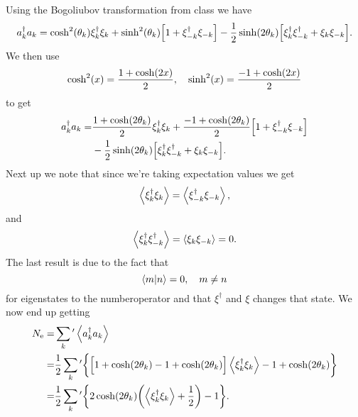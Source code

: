 \documentclass[11pt,letter, swedish, english
]{article}
\begin{document}
Using the Bogoliubov transformation from class we have
\begin{equation}
\begin{aligned}
a^\dagger_ka_k=\cosh^2(\theta_k) \xi^\dagger_k\xi_k 
+\sinh^2(\theta_k)\qty[1+\xi^\dagger_{-k}\xi_{-k} ]
-\frac{1}{2}\sinh(2\theta_k) 
\qty[\xi^\dagger_{k}\xi^\dagger_{-k}+\xi_{k}\xi_{-k}].
\end{aligned}
\end{equation}
We then use
\begin{equation}
\cosh^2(x)=\frac{1+\cosh(2x)}{2}\qcomma
\sinh^2(x)=\frac{-1+\cosh(2x)}{2}
\end{equation}
to get
\begin{equation}
\begin{aligned}
a^\dagger_ka_k=&\frac{1+\cosh(2\theta_k)}{2}\xi^\dagger_k\xi_k 
+\frac{-1+\cosh(2\theta_k)}{2}\qty[1+\xi^\dagger_{-k}\xi_{-k} ]\\
&-\frac{1}{2}\sinh(2\theta_k) 
\qty[\xi^\dagger_{k}\xi^\dagger_{-k}+\xi_{k}\xi_{-k}].
\end{aligned}
\end{equation}
Next up we note that since we're taking expectation values we get
\begin{equation}
\ev{\xi^\dagger_k\xi_k }=\ev{\xi^\dagger_{-k}\xi_{-k}},
\end{equation}
and
\begin{equation}
\ev{\xi^\dagger_{k}\xi^\dagger_{-k}}=\ev{\xi_{k}\xi_{-k}}=0.
\end{equation}
The last result is due to the fact that 
\begin{equation}
\ip{m}{n}=0\qcomma m\neq n
\end{equation}
for eigenstates to the numberoperator and that $\xi^\dagger$ and $\xi$
changes that state. 
We now end up getting
\begin{equation}\label{eq:2_N_sum}
\begin{aligned}
\Ne=&\sum_k{'}\ev{a^\dagger_ka_k}\\
=&\frac{1}{2}
\sum_k{'}\bigg\{\Big[1+\cosh(2\theta_k) -1+\cosh(2\theta_k)\Big]
\ev{\xi^\dagger_k\xi_k }-1+\cosh(2\theta_k)\bigg\}\\
=&\frac{1}{2}\sum_k{'}\qty{
2\cosh(2\theta_k)\qty(\ev{\xi^\dagger_k\xi_k }+\frac{1}{2})-1
}.
\end{aligned}
\end{equation}
\end{document}
